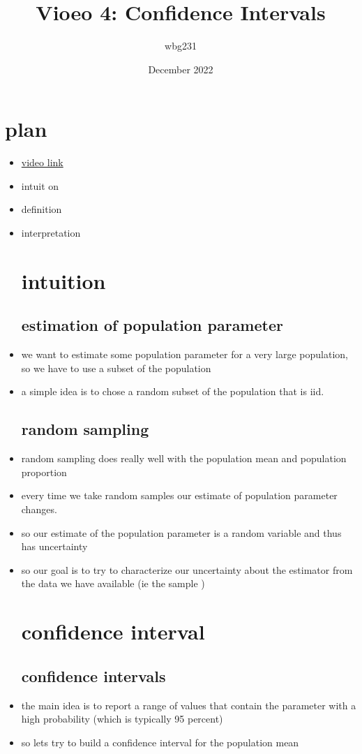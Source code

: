 \documentclass{article}
\title{Vioeo 4: Confidence Intervals}
\author{wbg231 }
\date{December 2022}
\begin{document}
\maketitle

\section{plan}
\begin{itemize}
\item \href{https://www.youtube.com/watch?v=soWJ3Wti0FM}{video link}
\item intuit on 
\item definition
\item interpretation
\section{intuition}
\subsection{estimation of population parameter}
\item we want to estimate some population parameter for a very large population, so we have to use a subset of the population 
\item a simple idea is to chose a random subset of the population that is iid. 
\subsection{random sampling}
\item random sampling does really well with the population mean and population proportion 
\item every time we take random samples our estimate of population parameter changes.
\item so our estimate of the population parameter is a random variable and thus has uncertainty
\item so our goal is to try to characterize our uncertainty about the estimator from the data we have available (ie the sample )
\section{confidence interval}
\subsection{confidence intervals}
\item the main idea is to report a range of values that contain the parameter with a high probability (which is typically 95 percent)
\item so lets try to build a confidence interval for the population mean

\end{itemize}
\end{document}
